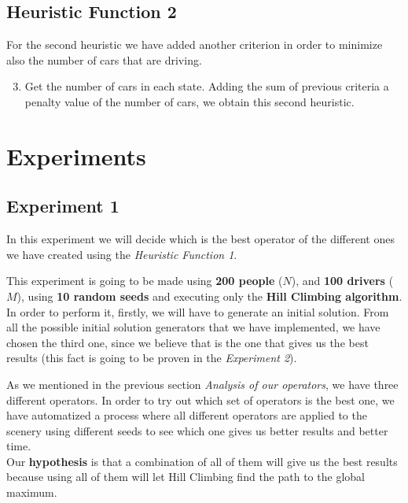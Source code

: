 \documentclass[12]{article}
\begin{document}
\subsection{Heuristic Function 2}

For the second heuristic we have added another criterion in order to minimize also the number of cars that are driving. 

\begin{enumerate}
  \setcounter{enumi}{2}
  \item Get the number of cars in each state. Adding the sum of previous criteria a penalty value of the number of cars, we obtain this second heuristic.
\end{enumerate}

\section{Experiments}

\subsection{Experiment 1}
In this experiment we will decide which is the best operator of the different ones we have created using the \textit{Heuristic Function 1}. 
\\
\medskip 

This experiment is going to be made using \textbf{200 people }($N$), and \textbf{100 drivers }($M$), using \textbf{10 random seeds} and executing only the \textbf{Hill Climbing algorithm}. In order to perform it, firstly, we will have to generate an initial solution. From all the possible initial solution generators that we have implemented, we have chosen the third one, since we believe that is the one that gives us the best results (this fact is going to be proven in the \textit{Experiment 2}). 

As we mentioned in the previous section \textit{Analysis of our operators}, we have three different operators. In order to try out which set of operators is the best one, we have automatized a process where all different operators are applied to the scenery using different seeds to see which one gives us better results and better time. 
\\
Our \textbf{hypothesis} is that a combination of all of them will give us the best results because using all of them will let Hill Climbing find the path to the global maximum. 
\end{document}
